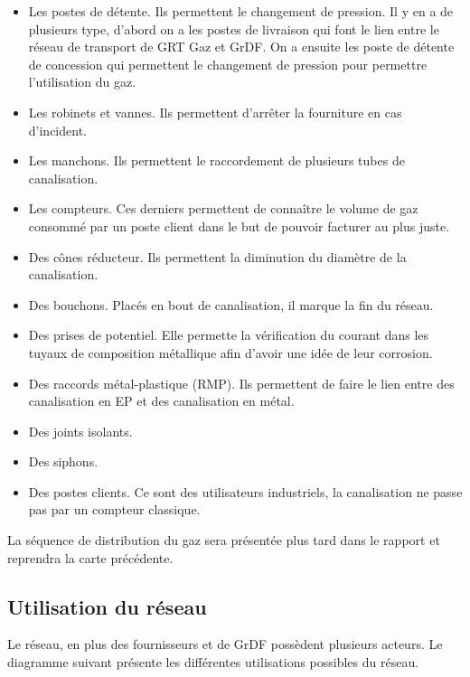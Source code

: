 \documentclass[
12pt,
french,                           %
a4paper,
]{article}
\begin{document}
\begin{itemize}
\item
  Les postes de détente. Ils permettent le changement de pression. Il y
  en a de plusieurs type, d'abord on a les postes de livraison qui font
  le lien entre le réseau de transport de GRT Gaz et GrDF. On a ensuite
  les poste de détente de concession qui permettent le changement de
  pression pour permettre l'utilisation du gaz.
\item
  Les robinets et vannes. Ils permettent d'arrêter la fourniture en cas
  d'incident.
\item
  Les manchons. Ils permettent le raccordement de plusieurs tubes de
  canalisation.
\item
  Les compteurs. Ces derniers permettent de connaître le volume de gaz
  consommé par un poste client dans le but de pouvoir facturer au plus
  juste.
\item
  Des cônes réducteur. Ils permettent la diminution du diamètre de la
  canalisation.
\item
  Des bouchons. Placés en bout de canalisation, il marque la fin du
  réseau.
\item
  Des prises de potentiel. Elle permette la vérification du courant dans
  les tuyaux de composition métallique afin d'avoir une idée de leur
  corrosion.
\item
  Des raccords métal-plastique (RMP). Ils permettent de faire le lien
  entre des canalisation en EP et des canalisation en métal.
\item
  Des joints isolants.
\item
  Des siphons.
\item
  Des postes clients. Ce sont des utilisateurs industriels, la
  canalisation ne passe pas par un compteur classique.
\end{itemize}

La séquence de distribution du gaz sera présentée plus tard dans le
rapport et reprendra la carte précédente.

\subsection{Utilisation du réseau}

Le réseau, en plus des fournisseurs et de GrDF possèdent plusieurs
acteurs. Le diagramme suivant présente les différentes utilisations
possibles du réseau.
\end{document}
